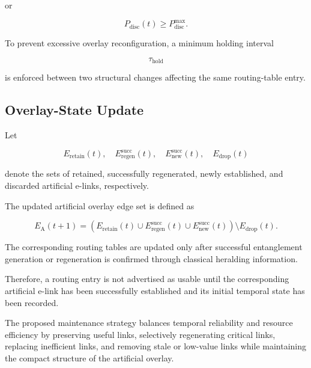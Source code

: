 or

\begin{equation}
    P_{\mathrm{disc}}(t)
    \geq
    P_{\mathrm{disc}}^{\max}.
\end{equation}

To prevent excessive overlay reconfiguration, a minimum holding interval

\begin{equation}
    \tau_{\mathrm{hold}}
\end{equation}

is enforced between two structural changes affecting the same routing-table entry.

\subsection{Overlay-State Update}

Let

\begin{equation}
    E_{\mathrm{retain}}(t),
    \quad
    E_{\mathrm{regen}}^{\mathrm{succ}}(t),
    \quad
    E_{\mathrm{new}}^{\mathrm{succ}}(t),
    \quad
    E_{\mathrm{drop}}(t)
\end{equation}

denote the sets of retained, successfully regenerated, newly established, and discarded artificial e-links, respectively.

The updated artificial overlay edge set is defined as

\begin{equation}
    E_{\mathrm{A}}(t+1)
    =
    \left(
    E_{\mathrm{retain}}(t)
    \cup
    E_{\mathrm{regen}}^{\mathrm{succ}}(t)
    \cup
    E_{\mathrm{new}}^{\mathrm{succ}}(t)
    \right)
    \setminus
    E_{\mathrm{drop}}(t).
\end{equation}

The corresponding routing tables are updated only after successful entanglement generation or regeneration is confirmed through classical heralding information.

Therefore, a routing entry is not advertised as usable until the corresponding artificial e-link has been successfully established and its initial temporal state has been recorded.

The proposed maintenance strategy balances temporal reliability and resource efficiency by preserving useful links, selectively regenerating critical links, replacing inefficient links, and removing stale or low-value links while maintaining the compact structure of the artificial overlay.


